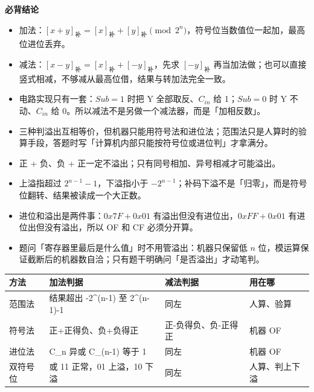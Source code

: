 \documentclass[10pt,a4paper]{ctexart}
\begin{document}

\textbf{必背结论}

\begin{itemize}

\item 加法：$[x+y]_补=[x]_补+[y]_补 \pmod{2^n}$，符号位当数值位一起加，最高位进位丢弃。

\item 减法：$[x-y]_补=[x]_补+[-y]_补$，先求 $[-y]_补$ 再当加法做；也可以直接竖式相减，不够减从最高位借，结果与转加法完全一致。

\item 电路实现只有一套：$Sub=1$ 时把 Y 全部取反、$C_{in}$ 给 1；$Sub=0$ 时 Y 不动、$C_{in}$ 给 0。所以减法不是另做一个减法器，而是「加相反数」。

\item 三种判溢出互相等价，但机器只能用符号法和进位法；范围法只是人算时的验算手段，答题时写「计算机内部只能按符号位或进位判」才拿满分。

\item 正 + 负、负 + 正一定不溢出；只有同号相加、异号相减才可能溢出。

\item 上溢指超过 $2^{n-1}-1$，下溢指小于 $-2^{n-1}$；补码下溢不是「归零」，而是符号位翻转、结果被读成一个大正数。

\item 进位和溢出是两件事：$0x7F+0x01$ 有溢出但没有进位出，$0xFF+0x01$ 有进位出但没有溢出，所以 OF 和 CF 必须分开算。

\item 题问「寄存器里最后是什么值」时不用管溢出：机器只保留低 $n$ 位，模运算保证截断后的机器数自洽；只有题干明确问「是否溢出」才动笔判。

\end{itemize}

\begin{center}\small
\begin{tabularx}{\linewidth}{@{}l>{\raggedright\arraybackslash}X>{\raggedright\arraybackslash}Xl@{}}
\toprule
方法 & 加法判据 & 减法判据 & 用在哪 \\
\midrule
范围法 & 结果超出 -2\textasciicircum{}(n-1) 至 2\textasciicircum{}(n-1)-1 & 同左 & 人算、验算 \\
符号法 & 正+正得负、负+负得正 & 正-负得负、负-正得正 & 机器 OF \\
进位法 & C\_n 异或 C\_(n-1) 等于 1 & 同左 & 机器 OF \\
双符号位 & 00 或 11 正常，01 上溢，10 下溢 & 同左 & 人算、判上下溢 \\
\bottomrule
\end{tabularx}
\end{center}
\end{document}
